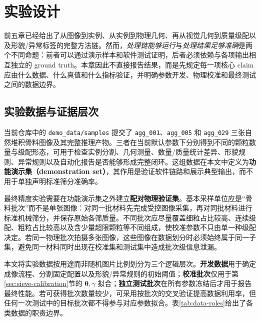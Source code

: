 \section{实验设计}
\label{sec:experimental-design}

前五章已经给出了从图像到实例、从实例到物理几何、再从视觉几何到质量级配以及形貌/异常标签的完整方法链。然而，\emph{处理链能够运行}与\emph{处理结果足够准确}是两个不同命题：前者可以通过演示样本和软件测试证明，后者必须依赖与各项输出相互独立的 ground truth。本章因此不直接报告结果，而是先规定每一项核心 claim 应由什么数据、什么真值和什么指标验证，并明确参数开发、物理校准和最终测试之间的数据边界。

\subsection{实验数据与证据层次}
\label{sec:dataset-design}

当前仓库中的 \texttt{demo\_data/samples} 提交了 \texttt{agg\_001}、\texttt{agg\_005} 和 \texttt{agg\_029} 三张自然堆积骨料图像及其完整推理产物。三者在当前默认参数下分别得到不同的颗粒数量与级配形态，可用于检查实例分割、几何测量、数量/质量统计差异、形貌规则、异常规则以及自动化报告是否能够形成完整闭环。这组数据在本文中定义为\textbf{功能演示集（demonstration set）}，其作用是验证软件链路和展示典型输出，而不用于单独声明标准筛分准确率。

最终精度实验需要在功能演示集之外建立\textbf{配对物理验证集}。基本采样单位应是“骨料批次”而不是单张图像：对同一批材料先完成受控图像采集，再对同批材料进行标准机械筛分，并保存原始各筛质量。不同批次应尽量覆盖细粒占比较高、连续级配、粗粒占比较高以及含少量超限颗粒等不同组成，使校准参数不只由单一种级配决定。若同一物理批次拍摄多张图像，这些图像在数据划分时必须始终属于同一子集，避免同一材料同时出现在校准集和测试集中造成批次级信息泄漏。

本文将实验数据按用途而非随机图片比例划分为三个逻辑层次。\textbf{开发数据}用于确定成像流程、分割固定配置以及形貌/异常规则的初始阈值；\textbf{校准批次}仅用于第\ref{sec:sieve-calibration}节的 $\boldsymbol{\theta},\gamma$ 拟合；\textbf{独立测试批次}在所有参数冻结后才用于报告最终性能。若可获得批次数量较少，可采用按批次的交叉验证提高数据利用率，但任何一次测试中的目标批次都不得参与对应参数拟合。表\ref{tab:data-roles}给出了各类数据的职责边界。

